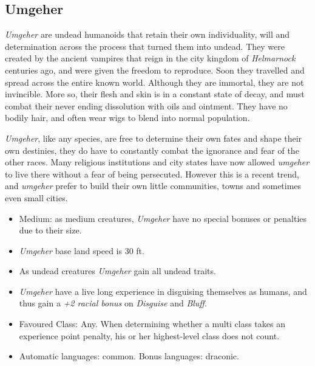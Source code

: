 
\subsection*{Umgeher}



\emph{Umgeher} are undead humanoids that retain their own individuality,
will and determination across the process that turned them into undead. They
were created by the ancient vampires that reign in the city kingdom of
\emph{Helmarnock} centuries ago, and were given the freedom to reproduce.
Soon they travelled and spread across the entire known world. Although they
are immortal, they are not invincible. More so, their flesh and skin is in a
constant state of decay, and must combat their never ending dissolution with
oils and ointment. They have no bodily hair, and often wear wigs to blend into
normal population.

\emph{Umgeher}, like any species, are free to determine their own fates and
shape their own destinies, they do have to constantly combat the ignorance and
fear of the other races. Many religious institutions and city states have now
allowed \emph{umgeher} to live there without a fear of being persecuted.
However this is a recent trend, and \emph{umgeher} prefer to build their own
little communities, towns and sometimes even small cities.

\begin{35e}
  \begin{itemize}[noitemsep]
    \item Medium: as medium creatures, \emph{Umgeher} have no special bonuses or
    penalties due to their size.
    \item \emph{Umgeher} base land speed is 30 ft.
    \item As undead creatures \emph{Umgeher} gain all undead traits.
    \item \emph{Umgeher} have a live long experience in disguising themselves as
    humans, and thus gain a \emph{+2 racial bonus} on \emph{Disguise} and
    \emph{Bluff}.
    \item Favoured Class: Any. When determining whether a multi class takes an
    experience point penalty, his or her highest-level class does not count.
    \item Automatic languages: common. Bonus languages: draconic.
  \end{itemize}
\end{35e}

